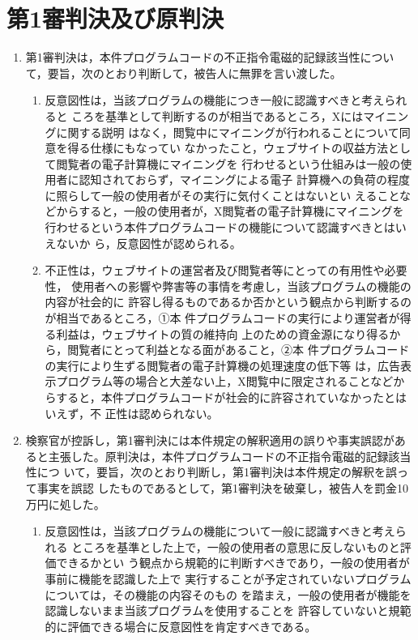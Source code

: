 \documentclass[12pt,a4paper]{ltjsarticle}
\begin{document}
 \section{第1審判決及び原判決}
 \begin{enumerate}
  \item 第1審判決は，本件プログラムコードの不正指令電磁的記録該当性につい
        て，要旨，次のとおり判断して，被告人に無罪を言い渡した。
        \begin{enumerate}
         \item 反意図性は，当該プログラムの機能につき一般に認識すべきと考えられると
               ころを基準として判断するのが相当であるところ，Xにはマイニングに関する説明
               はなく，閲覧中にマイニングが行われることについて同意を得る仕様にもなってい
               なかったこと，ウェブサイトの収益方法として閲覧者の電子計算機にマイニングを
               行わせるという仕組みは一般の使用者に認知されておらず，マイニングによる電子
               計算機への負荷の程度に照らして一般の使用者がその実行に気付くことはないとい
               えることなどからすると，一般の使用者が，X閲覧者の電子計算機にマイニングを
               行わせるという本件プログラムコードの機能について認識すべきとはいえないか
               ら，反意図性が認められる。
         \item 不正性は，ウェブサイトの運営者及び閲覧者等にとっての有用性や必要性，
               使用者への影響や弊害等の事情を考慮し，当該プログラムの機能の内容が社会的に
               許容し得るものであるか否かという観点から判断するのが相当であるところ，①本
               件プログラムコードの実行により運営者が得る利益は，ウェブサイトの質の維持向
               上のための資金源になり得るから，閲覧者にとって利益となる面があること，②本
               件プログラムコードの実行により生ずる閲覧者の電子計算機の処理速度の低下等
               は，広告表示プログラム等の場合と大差ない上，X閲覧中に限定されることなどか
               らすると，本件プログラムコードが社会的に許容されていなかったとはいえず，不
               正性は認められない。
        \end{enumerate}
  \item 検察官が控訴し，第1審判決には本件規定の解釈適用の誤りや事実誤認があ
        ると主張した。原判決は，本件プログラムコードの不正指令電磁的記録該当性につ
        いて，要旨，次のとおり判断し，第1審判決は本件規定の解釈を誤って事実を誤認
        したものであるとして，第1審判決を破棄し，被告人を罰金10万円に処した。
        \begin{enumerate}
         \item 反意図性は，当該プログラムの機能について一般に認識すべきと考えられる
               ところを基準とした上で，一般の使用者の意思に反しないものと評価できるかとい
               う観点から規範的に判断すべきであり，一般の使用者が事前に機能を認識した上で
               実行することが予定されていないプログラムについては，その機能の内容そのもの
               を踏まえ，一般の使用者が機能を認識しないまま当該プログラムを使用することを
               許容していないと規範的に評価できる場合に反意図性を肯定すべきである。


\end{enumerate}
\end{enumerate}
\end{document}
